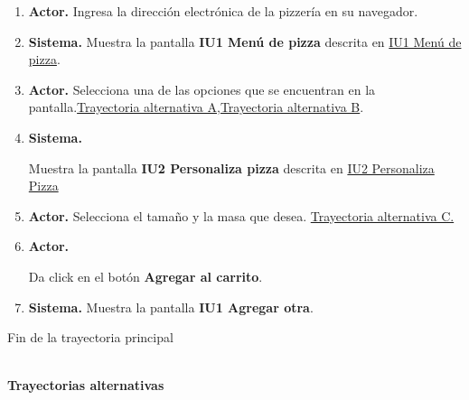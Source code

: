 		\begin{enumerate}
			\item {\textbf{Actor.}} Ingresa la dirección electrónica de la pizzería en su navegador.
			
			\item \textbf{Sistema.} Muestra la pantalla \textbf{IU1 Menú de pizza} descrita en \hyperlink{IU1}{IU1 Menú de pizza}.
			
			\item \textbf{Actor.} Selecciona una de las opciones que se encuentran en la pantalla.\hyperlink{CU1:TAA}{Trayectoria alternativa A},\hyperlink{CU1:TAB}{Trayectoria alternativa B}. 
			
			\item \hypertarget{CU1:TP:P4}{\textbf{Sistema.}} Muestra la pantalla  \textbf{IU2 Personaliza pizza} descrita en \hyperlink{IU2}{IU2 Personaliza Pizza}
			
			\item \textbf{Actor.} Selecciona el tamaño y la masa que desea. \hyperlink{CU1:TAC}{Trayectoria alternativa C.}
			
			\item  \hypertarget{CU1:TP:P6}{\textbf{Actor.}} Da click en el botón \textbf{Agregar al carrito}.
			
			\item \textbf{Sistema.} Muestra la pantalla \textbf{IU1 Agregar otra}.
			
			
		\end{enumerate}	
		Fin de la trayectoria principal

	\noindent \textbf{\\Trayectorias alternativas}

